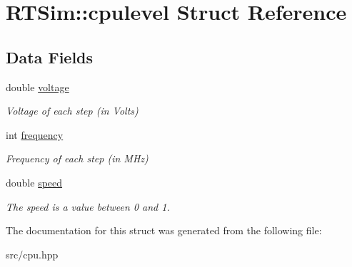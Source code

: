 \hypertarget{structRTSim_1_1cpulevel}{}\section{R\+T\+Sim\+:\+:cpulevel Struct Reference}
\label{structRTSim_1_1cpulevel}
\subsection*{Data Fields}
\begin{DoxyCompactItemize}
\item 
double \hyperlink{structRTSim_1_1cpulevel_af3af2137238bf8a80aaf416adb15da3e}{voltage}\hypertarget{structRTSim_1_1cpulevel_af3af2137238bf8a80aaf416adb15da3e}{}\label{structRTSim_1_1cpulevel_af3af2137238bf8a80aaf416adb15da3e}

\begin{DoxyCompactList}\small\item\em Voltage of each step (in Volts) \end{DoxyCompactList}\item 
int \hyperlink{structRTSim_1_1cpulevel_a4b98b8b5c119cd8e8cf0be3e3f7848f7}{frequency}\hypertarget{structRTSim_1_1cpulevel_a4b98b8b5c119cd8e8cf0be3e3f7848f7}{}\label{structRTSim_1_1cpulevel_a4b98b8b5c119cd8e8cf0be3e3f7848f7}

\begin{DoxyCompactList}\small\item\em Frequency of each step (in M\+Hz) \end{DoxyCompactList}\item 
double \hyperlink{structRTSim_1_1cpulevel_aa1306df78479aaacc5ced31f82b84111}{speed}\hypertarget{structRTSim_1_1cpulevel_aa1306df78479aaacc5ced31f82b84111}{}\label{structRTSim_1_1cpulevel_aa1306df78479aaacc5ced31f82b84111}

\begin{DoxyCompactList}\small\item\em The speed is a value between 0 and 1. \end{DoxyCompactList}\end{DoxyCompactItemize}


The documentation for this struct was generated from the following file\+:\begin{DoxyCompactItemize}
\item 
src/cpu.\+hpp\end{DoxyCompactItemize}
